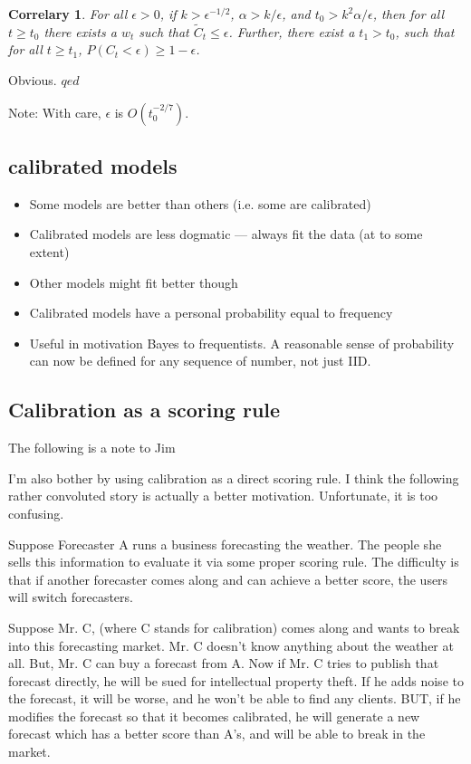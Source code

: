 \documentclass{book}
\newcommand{\white}{  }
\newtheorem{correlary}{Correlary}[chapter]
\newcommand{\notes}{\index{personal notes}}
\begin{document}
\begin{correlary} For all $\epsilon >0$, if $k>\epsilon^{-1/2}$, 
$\alpha > k/\epsilon$, and $t_0 > k^2\alpha/\epsilon$, then for all $t
\ge t_0$  there exists a $w_t$ such that $\tilde{C}_t \le \epsilon$.
Further, there exist a $t_1 > t_0$, such that for all $t \ge t_1$,
$P(C_t < \epsilon) \ge 1 - \epsilon$.
\end{correlary}
  Obvious. \hfill $qed$

Note: With care, $\epsilon$  is $O(t_0^{-2/7})$.

 \white
        \subsection[Calibration and Bayes]{calibrated models}

\begin{itemize}
        \item Some models are better than others (i.e. some are calibrated)
        \item Calibrated models are less dogmatic --- always fit the data
(at to some extent)
        \item Other models might fit better though
        \item Calibrated models have a personal probability equal to
                frequency 
        \item Useful in motivation Bayes to frequentists.  A
                reasonable sense of probability can now be defined for
                any sequence of number, not just IID.
\end{itemize}
 
        \subsection{Calibration as a scoring rule}


{\notes The following is a note to Jim} 

I'm also bother by using calibration as a direct scoring rule.  I think
the following rather convoluted story is actually a better motivation.
Unfortunate, it is too confusing.

Suppose Forecaster A runs a business forecasting the weather.  The
people she sells this information to evaluate it via some proper
scoring rule.  The difficulty is that if another forecaster comes
along and can achieve a better score, the users will switch forecasters.

Suppose Mr. C, (where C stands for calibration) comes along and wants
to break into this forecasting market.  Mr. C doesn't know anything
about the weather at all.  But, Mr. C can buy a forecast from A.  Now
if Mr. C tries to publish that forecast directly, he will be sued for
intellectual property theft.  If he adds noise to the forecast, it will
be worse, and he won't be able to find any clients.  BUT, if he
modifies the forecast so that it becomes calibrated, he will generate
a new forecast which has a better score than A's, and will be able to
break in the market.
\end{document}
